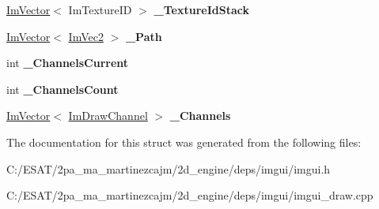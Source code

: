 \begin{DoxyCompactItemize}
\hyperlink{class_im_vector}{Im\+Vector}$<$ Im\+Texture\+ID $>$ {\bfseries \+\_\+\+Texture\+Id\+Stack}
\item 
\mbox{\label{struct_im_draw_list_a5bdc39abf351360500048628b8dc1b07}} 
\hyperlink{class_im_vector}{Im\+Vector}$<$ \hyperlink{struct_im_vec2}{Im\+Vec2} $>$ {\bfseries \+\_\+\+Path}
\item 
\mbox{\label{struct_im_draw_list_a143ff30108f3dca8c28c7925e23d358b}} 
int {\bfseries \+\_\+\+Channels\+Current}
\item 
\mbox{\label{struct_im_draw_list_ae3854c12dbac41400f4acb65192f5015}} 
int {\bfseries \+\_\+\+Channels\+Count}
\item 
\mbox{\label{struct_im_draw_list_ae6be941728e5b2c81a03c78e4aa22629}} 
\hyperlink{class_im_vector}{Im\+Vector}$<$ \hyperlink{struct_im_draw_channel}{Im\+Draw\+Channel} $>$ {\bfseries \+\_\+\+Channels}
\end{DoxyCompactItemize}


The documentation for this struct was generated from the following files\+:\begin{DoxyCompactItemize}
\item 
C\+:/\+E\+S\+A\+T/2pa\+\_\+ma\+\_\+martinezcajm/2d\+\_\+engine/deps/imgui/imgui.\+h\item 
C\+:/\+E\+S\+A\+T/2pa\+\_\+ma\+\_\+martinezcajm/2d\+\_\+engine/deps/imgui/imgui\+\_\+draw.\+cpp\end{DoxyCompactItemize}
